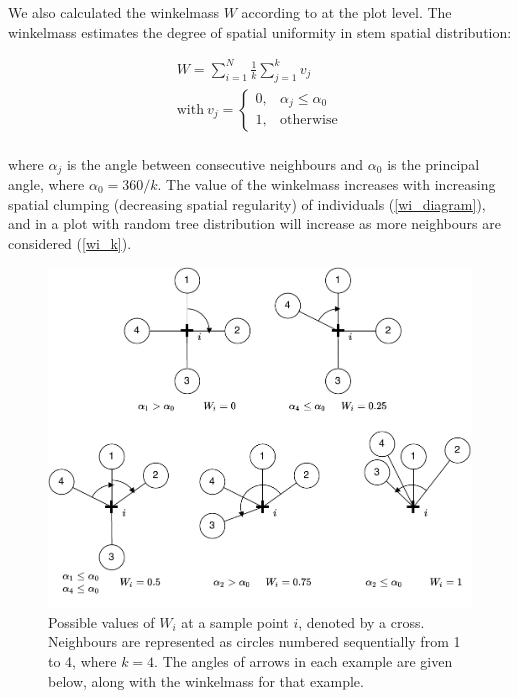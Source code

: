 \documentclass[11pt,a4paper]{article}
\begin{document}
We also calculated the winkelmass $W$ according to \citet{Gadow2002} at the plot level. The winkelmass estimates the degree of spatial uniformity in stem spatial distribution:

\begin{gather}
	W = \sum_{i=1}^{N} \frac{1}{k} \sum_{j=1}^{k} v_{j} \\
	\text{with}\ v_{j} = \begin{cases}
		0,& \alpha_{j} \le \alpha_{0} \\
		1,& \text{otherwise}
	\end{cases} \\
\end{gather}

where $\alpha_{j}$ is the angle between consecutive neighbours and $\alpha_{0}$ is the principal angle, where $\alpha_{0} = 360 / k$. The value of the winkelmass increases with increasing spatial clumping (decreasing spatial regularity) of individuals (\autoref{wi_diagram}), and in a plot with random tree distribution will increase as more neighbours are considered (\autoref{wi_k}).

\begin{figure}[H]
\centering
	\includegraphics[width=\textwidth]{winkelmass}
	\caption{Possible values of $W_{i}$ at a sample point $i$, denoted by a cross. Neighbours are represented as circles numbered sequentially from 1 to 4, where $k = 4$. The angles of arrows in each example are given below, along with the winkelmass for that example.}
	\label{winkelmass}
\end{figure}
\end{document}
